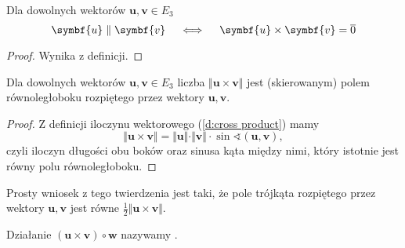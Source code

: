 \begin{fact}
    Dla dowolnych wektorów $\symbf{u}, \symbf{v} \in E_3$
    \[ \symbf{u} \parallel \symbf{v} \quad \iff \quad \symbf{u} \times \symbf{v} = \ol{0} \]
\end{fact}
\begin{proof}
    Wynika z definicji.
\end{proof}

\begin{theorem}
    \label{t:area of parallelogram}
    Dla dowolnych wektorów $\symbf{u}, \symbf{v} \in E_3$ liczba $\Vert\symbf{u}\times\symbf{v}\Vert$ jest (skierowanym) polem równoległoboku rozpiętego przez wektory $\symbf{u}, \symbf{v}$.
\end{theorem}
\begin{proof}
    Z definicji iloczynu wektorowego (\ref{d:cross product}) mamy
    \[ \Vert\symbf{u}\times\symbf{v}\Vert = \Vert\symbf{u}\Vert\cdot\Vert\symbf{v}\Vert\cdot\sin\sphericalangle(\symbf{u}, \symbf{v}), \]
    czyli iloczyn długości obu boków oraz sinusa kąta między nimi, który istotnie jest równy polu równoległoboku.
\end{proof}

Prosty wniosek z tego twierdzenia jest taki, że pole trójkąta rozpiętego przez wektory $\symbf{u}, \symbf{v}$ jest równe $\frac{1}{2}\Vert\symbf{u}\times\symbf{v}\Vert$.

Działanie $(\symbf{u}\times\symbf{v}) \circ \symbf{w}$ nazywamy .

